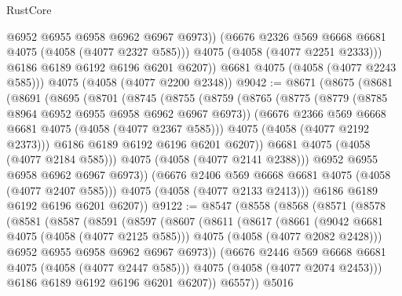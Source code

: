 \begin{lexlean}{RustCore}
\begin{coremodule}
                @6952
                @6955
                @6958
                @6962
                @6967
                @6973))
            (@6676 @2326 @569 @6668 @6681 @4075 (@4058 (@4077 @2327 @585)))
            @4075
            (@4058 (@4077 @2251 @2333)))
          @6186
          @6189
          @6192
          @6196
          @6201
          @6207))
      @6681
      @4075
      (@4058 (@4077 @2243 @585)))
    @4075
    (@4058 (@4077 @2200 @2348))
@9042 := @8671
    (@8675
      (@8681
        (@8691
          (@8695
            (@8701
              (@8745
                (@8755
                  (@8759
                    (@8765
                      (@8775
                        (@8779 (@8785 @8964 @6952 @6955 @6958 @6962 @6967 @6973))
                        (@6676 @2366 @569 @6668 @6681 @4075 (@4058 (@4077 @2367 @585)))
                        @4075
                        (@4058 (@4077 @2192 @2373)))
                      @6186
                      @6189
                      @6192
                      @6196
                      @6201
                      @6207))
                  @6681
                  @4075
                  (@4058 (@4077 @2184 @585)))
                @4075
                (@4058 (@4077 @2141 @2388)))
              @6952
              @6955
              @6958
              @6962
              @6967
              @6973))
          (@6676 @2406 @569 @6668 @6681 @4075 (@4058 (@4077 @2407 @585)))
          @4075
          (@4058 (@4077 @2133 @2413)))
        @6186
        @6189
        @6192
        @6196
        @6201
        @6207))
@9122 := @8547
    (@8558
      (@8568
        (@8571
          (@8578
            (@8581
              (@8587
                (@8591
                  (@8597
                    (@8607
                      (@8611
                        (@8617
                          (@8661
                            (@9042 @6681 @4075 (@4058 (@4077 @2125 @585)))
                            @4075
                            (@4058 (@4077 @2082 @2428)))
                          @6952
                          @6955
                          @6958
                          @6962
                          @6967
                          @6973))
                      (@6676 @2446 @569 @6668 @6681 @4075 (@4058 (@4077 @2447 @585)))
                      @4075
                      (@4058 (@4077 @2074 @2453)))
                    @6186
                    @6189
                    @6192
                    @6196
                    @6201
                    @6207))
                @6557))
            @5016

\end{coremodule}
\end{lexlean}

